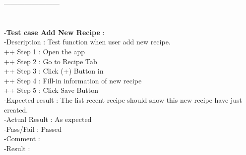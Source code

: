 \documentclass{article}
\begin{document}
     ------------------------\\ \\ \\
    -\textbf{Test case Add New Recipe }: \\
    -Description : Test function when user add new recipe. \\
    ++ Step 1 : Open the app  \\
    ++ Step 2 : Go to Recipe Tab \\
    ++ Step 3 : Click (+) Button in  \\
    ++ Step 4 : Fill-in information of new recipe \\
    ++ Step 5 : Click Save Button \\
    -Expected result : The list recent recipe should show this new recipe have just created. \\
    -Actual Result : As expected \\
    -Pass/Fail : Passed \\
    -Comment :  \\
    -Result : 
\end{document}
